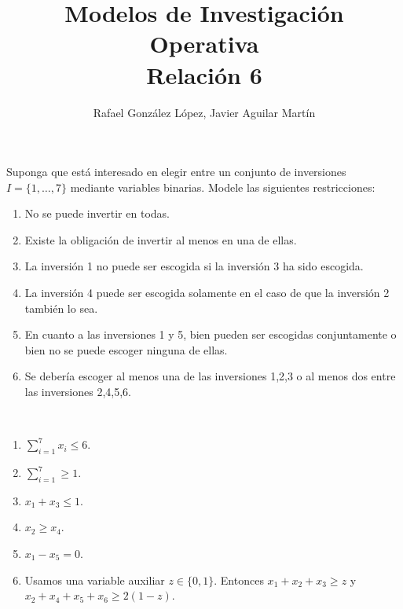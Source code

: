 \documentclass[twoside]{article}
\begin{document}
\title{Modelos de Investigación Operativa\\ Relación 6}
\author{Rafael González López, Javier Aguilar Martín}
\date{}
\maketitle

\begin{ejercicio}{1}
Suponga que está interesado en elegir entre un conjunto de inversiones $I=\{1,\dots,7\}$ mediante variables binarias. Modele las siguientes restricciones:
\begin{enumerate}
\item No se puede invertir en todas.
\item Existe la obligación de invertir al menos en una de ellas.
\item La inversión 1 no puede ser escogida si la inversión 3 ha sido escogida.
\item La inversión 4 puede ser escogida solamente en el caso de que la inversión 2 también lo sea.
\item En cuanto a las inversiones 1 y 5, bien pueden ser escogidas conjuntamente o bien no se puede escoger ninguna de ellas.
\item Se debería escoger al menos una de las inversiones 1,2,3 o al menos dos entre las inversiones 2,4,5,6.
\end{enumerate}
\end{ejercicio}
\begin{solucion}\
\begin{enumerate}
\item $\sum_{i=1}^7x_i\leq 6$. 
\item $\sum_{i=1}^7\geq 1$.
\item $x_1+x_3\leq 1$.
\item $x_2\geq x_4$. 
\item $x_1-x_5=0$.
\item Usamos una variable auxiliar $z\in\{0,1\}$. Entonces $x_1+x_2+x_3\geq z$ y $x_2+x_4+x_5+x_6\geq 2(1-z)$. 
\end{enumerate}
\end{solucion}

\newpage
\end{document}

